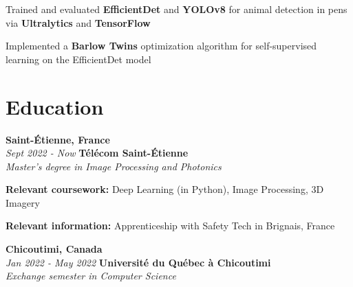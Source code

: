         \begin{onecolentry}
            \begin{highlights}
                \item Trained and evaluated \textbf{EfficientDet} and \textbf{YOLOv8} for animal detection in pens via \textbf{Ultralytics} and \textbf{TensorFlow}
                \item Implemented a \textbf{Barlow Twins} optimization algorithm for self-supervised learning on the EfficientDet model
            \end{highlights}
        \end{onecolentry}

    
    \section{Education}
       \begin{twocolentry}{
            \textbf{Saint-Étienne, France}\\
            \textit{Sept 2022 - Now}
            }{
            \textbf{Télécom Saint-Étienne}\\
            \textit{Master's degree in Image Processing and Photonics}%
            }
        \end{twocolentry}


        \begin{onecolentry}
            \begin{highlights}
                \item \textbf{Relevant coursework:} Deep Learning (in Python), Image Processing, 3D Imagery
                \item \textbf{Relevant information:} Apprenticeship with Safety Tech in Brignais, France
            \end{highlights}
        \end{onecolentry}

		\begin{twocolentry}{
			\textbf{Chicoutimi, Canada} \\
			\textit{Jan 2022 - May 2022}
            }{
            \textbf{Université du Québec à Chicoutimi} \\
            \textit{Exchange semester in Computer Science}
            }
        \end{twocolentry}

